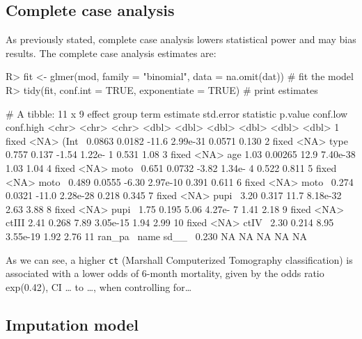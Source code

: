\documentclass[
]{jss}
\begin{document}
\hypertarget{complete-case-analysis}{%
\subsection{Complete case analysis}\label{complete-case-analysis}}

As previously stated, complete case analysis lowers statistical power
and may bias results. The complete case analysis estimates are:

\begin{CodeChunk}
\begin{CodeInput}
R> fit <- glmer(mod, family = "binomial", data = na.omit(dat)) # fit the model
R> tidy(fit, conf.int = TRUE, exponentiate = TRUE)             # print estimates
\end{CodeInput}
\begin{CodeOutput}
# A tibble: 11 x 9
   effect  group term  estimate std.error statistic   p.value conf.low conf.high
   <chr>   <chr> <chr>    <dbl>     <dbl>     <dbl>     <dbl>    <dbl>     <dbl>
 1 fixed   <NA>  (Int~   0.0863   0.0182     -11.6   2.99e-31   0.0571     0.130
 2 fixed   <NA>  type~   0.757    0.137       -1.54  1.22e- 1   0.531      1.08 
 3 fixed   <NA>  age     1.03     0.00265     12.9   7.40e-38   1.03       1.04 
 4 fixed   <NA>  moto~   0.651    0.0732      -3.82  1.34e- 4   0.522      0.811
 5 fixed   <NA>  moto~   0.489    0.0555      -6.30  2.97e-10   0.391      0.611
 6 fixed   <NA>  moto~   0.274    0.0321     -11.0   2.28e-28   0.218      0.345
 7 fixed   <NA>  pupi~   3.20     0.317       11.7   8.18e-32   2.63       3.88 
 8 fixed   <NA>  pupi~   1.75     0.195        5.06  4.27e- 7   1.41       2.18 
 9 fixed   <NA>  ctIII   2.41     0.268        7.89  3.05e-15   1.94       2.99 
10 fixed   <NA>  ctIV~   2.30     0.214        8.95  3.55e-19   1.92       2.76 
11 ran_pa~ name  sd__~   0.230   NA           NA    NA         NA         NA    
\end{CodeOutput}
\end{CodeChunk}

As we can see, a higher \texttt{ct} (Marshall Computerized Tomography
classification) is associated with a lower odds of 6-month mortality,
given by the odds ratio exp(0.42), CI \ldots{} to \ldots, when
controlling for\ldots{}

\hypertarget{imputation-model}{%
\subsection{Imputation model}\label{imputation-model}}
\end{document}
